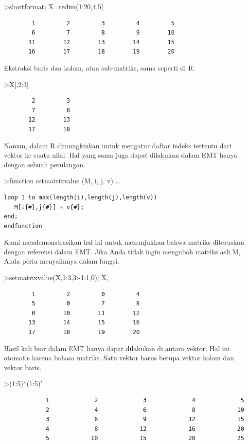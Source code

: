 \documentclass[
]{book}
\begin{document}
\textgreater shortformat; X=redim(1:20,4,5)

\begin{verbatim}
        1         2         3         4         5 
        6         7         8         9        10 
       11        12        13        14        15 
       16        17        18        19        20 
\end{verbatim}

Ekstraksi baris dan kolom, atau sub-matriks, sama seperti di R.

\textgreater X{[},2:3{]}

\begin{verbatim}
        2         3 
        7         8 
       12        13 
       17        18 
\end{verbatim}

Namun, dalam R dimungkinkan untuk mengatur daftar indeks tertentu dari vektor ke suatu nilai. Hal yang sama juga dapat dilakukan dalam EMT hanya dengan sebuah perulangan.

\textgreater function setmatrixvalue (M, i, j, v) \ldots{}

\begin{verbatim}
loop 1 to max(length(i),length(j),length(v))
   M[i{#},j{#}] = v{#};
end;
endfunction
\end{verbatim}

Kami mendemonstrasikan hal ini untuk menunjukkan bahwa matriks diteruskan dengan referensi dalam EMT. Jika Anda tidak ingin mengubah matriks asli M, Anda perlu menyalinnya dalam fungsi.

\textgreater setmatrixvalue(X,1:3,3:-1:1,0); X,

\begin{verbatim}
        1         2         0         4 
        5         0         7         8 
        0        10        11        12 
       13        14        15        16 
       17        18        19        20 
\end{verbatim}

Hasil kali luar dalam EMT hanya dapat dilakukan di antara vektor. Hal ini otomatis karena bahasa matriks. Satu vektor harus berupa vektor kolom dan vektor baris.

\textgreater(1:5)*(1:5)'

\begin{verbatim}
            1             2             3             4             5 
            2             4             6             8            10 
            3             6             9            12            15 
            4             8            12            16            20 
            5            10            15            20            25 
\end{verbatim}
\end{document}
